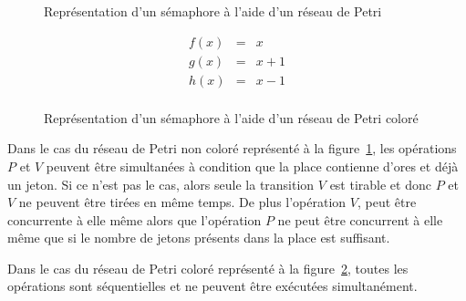 \begin{figure}
    \begin{center}
    \end{center}
    \caption{Représentation d'un sémaphore à l'aide d'un réseau de Petri}
    \label{exo7fig1}
\end{figure}

    \begin{figure}
\begin{minipage}[c]{0.6\linewidth}
\end{minipage}
\hfill
\begin{minipage}[c]{0.3\linewidth}
    \[
        \begin{array}{rcl}
            f(x) & = & x \\
            g(x) & = & x+1 \\
            h(x) & = & x-1 \\
        \end{array}
    \]
\end{minipage}
        \caption{Représentation d'un sémaphore à l'aide d'un réseau de Petri coloré}
        \label{exo7fig2}
\end{figure}

Dans le cas du réseau de Petri non coloré représenté à la figure~\ref{exo7fig1},
les opérations $P$ et $V$ peuvent être simultanées à condition que la place contienne d'ores et
déjà un jeton. Si ce n'est pas le cas, alors seule la transition $V$ est tirable et donc $P$ et $V$
ne peuvent être tirées en même temps. De plus l'opération $V$, peut être concurrente à elle même
alors que l'opération $P$ ne peut être concurrent à elle même que si le nombre de jetons présents dans
la place est suffisant.

Dans le cas du réseau de Petri coloré représenté à la figure~\ref{exo7fig2}, toutes les opérations
sont séquentielles et ne peuvent être exécutées simultanément.
